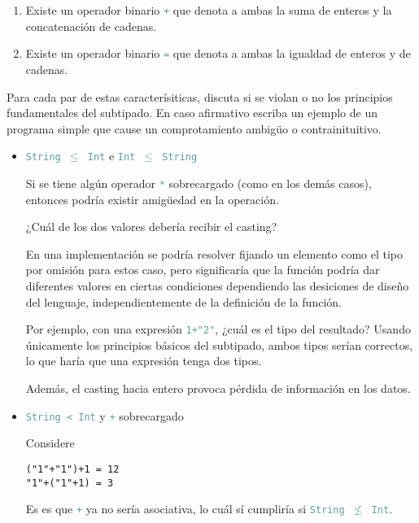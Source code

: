 \documentclass{article}
\newcommand{\tp}[1]{\textcolor{CadetBlue} {\texttt{#1}}}
\begin{document}
\begin{enumerate}
\begin{enumerate}
            \item Existe un operador binario \tp{+} que denota a ambas la suma
            de enteros y la concatenación de cadenas.

            \item Existe un operador binario \tp{=} que denota a ambas la
            igualdad de enteros y de cadenas.
        \end{enumerate}

        Para cada par de estas caracterísiticas, discuta si se violan o no los
        principios fundamentales del subtipado. En caso afirmativo escriba un
        ejemplo de un programa simple que cause un comprotamiento ambigüo o
        contrainituitivo.

        \begin{itemize}
            \item \tp{String $\leq$ Int} e \tp{Int $\leq$ String}

            Si se tiene algún operador \tp{*} sobrecargado (como en los demás
            casos), entonces podría existir amigüedad en la operación.

            ¿Cuál de los dos valores debería recibir el casting?

            En una implementación se podría resolver fijando un elemento como el
            tipo por omisión para estos caso, pero significaría que la función
            podría dar diferentes valores en ciertas condiciones dependiendo las
            desiciones de diseño del lenguaje, independientemente de la
            definición de la función.

            Por ejemplo, con una expresión \tp{1+"2"}, ¿cuál es el tipo del
            resultado? Usando únicamente los principios básicos del subtipado, 
            ambos tipos serían correctos, lo que haría que una expresión tenga 
            dos tipos.

            Además, el casting hacia entero provoca pérdida de información en 
            los datos.

            \item \tp{String < Int} y \tp{+} sobrecargado

            Considere

            \begin{verbatim}
("1"+"1")+1 = 12
"1"+("1"+1) = 3
            \end{verbatim}

            Es es que \tp{+} ya no sería asociativa, lo cuál sí cumpliría si
            \tp{String $\not \leq$ Int}.


\end{itemize}
\end{enumerate}
\end{document}
